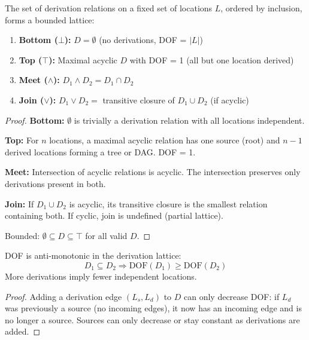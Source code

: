 \begin{theorem}\label{thm:derivation-lattice}
The set of derivation relations on a fixed set of locations $L$, ordered by inclusion, forms a bounded lattice:
\begin{enumerate}
\tightlist
\item \textbf{Bottom ($\bot$):} $D = \emptyset$ (no derivations, DOF = $|L|$)
\item \textbf{Top ($\top$):} Maximal acyclic $D$ with DOF = 1 (all but one location derived)
\item \textbf{Meet ($\land$):} $D_1 \land D_2 = D_1 \cap D_2$
\item \textbf{Join ($\lor$):} $D_1 \lor D_2 = $ transitive closure of $D_1 \cup D_2$ (if acyclic)
\end{enumerate}
\end{theorem}

\begin{proof}
\textbf{Bottom:} $\emptyset$ is trivially a derivation relation with all locations independent.

\textbf{Top:} For $n$ locations, a maximal acyclic relation has one source (root) and $n-1$ derived locations forming a tree or DAG. DOF = 1.

\textbf{Meet:} Intersection of acyclic relations is acyclic. The intersection preserves only derivations present in both.

\textbf{Join:} If $D_1 \cup D_2$ is acyclic, its transitive closure is the smallest relation containing both. If cyclic, join is undefined (partial lattice).

Bounded: $\emptyset \subseteq D \subseteq \top$ for all valid $D$.
\end{proof}

\begin{theorem}\label{thm:dof-antimonotone}
DOF is anti-monotonic in the derivation lattice:
\[
D_1 \subseteq D_2 \Rightarrow \text{DOF}(D_1) \geq \text{DOF}(D_2)
\]
More derivations imply fewer independent locations.
\end{theorem}

\begin{proof}
Adding a derivation edge $(L_s, L_d)$ to $D$ can only decrease DOF: if $L_d$ was previously a source (no incoming edges), it now has an incoming edge and is no longer a source. Sources can only decrease or stay constant as derivations are added.
\end{proof}

